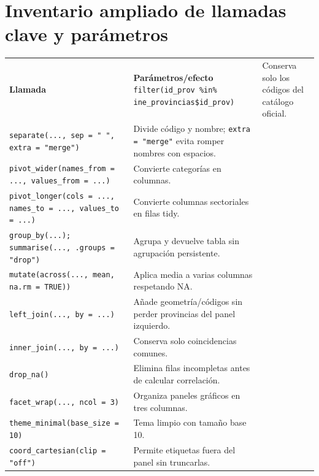 \documentclass[10pt,a4paper]{article}
\newcommand{\code}[1]{\texttt{\small #1}}
\begin{document}
\section{Inventario ampliado de llamadas clave y parámetros}
\begin{longtable}{p{}p{}}
\toprule\textbf{Llamada} & \textbf{Parámetros/efecto}\
\midrule\endhead
\code{filter(id\_prov \%in\% ine\_provincias\$id\_prov)} & Conserva solo los códigos del catálogo oficial.\\
\code{separate(..., sep = " ", extra = "merge")} & Divide código y nombre; \code{extra = "merge"} evita romper nombres con espacios.\\
\code{pivot\_wider(names\_from = ..., values\_from = ...)} & Convierte categorías en columnas.\\
\code{pivot\_longer(cols = ..., names\_to = ..., values\_to = ...)} & Convierte columnas sectoriales en filas tidy.\\
\code{group\_by(...); summarise(..., .groups = "drop")} & Agrupa y devuelve tabla sin agrupación persistente.\\
\code{mutate(across(..., mean, na.rm = TRUE))} & Aplica media a varias columnas respetando NA.\\
\code{left\_join(..., by = ...)} & Añade geometría/códigos sin perder provincias del panel izquierdo.\\
\code{inner\_join(..., by = ...)} & Conserva solo coincidencias comunes.\\
\code{drop\_na()} & Elimina filas incompletas antes de calcular correlación.\\
\code{facet\_wrap(..., ncol = 3)} & Organiza paneles gráficos en tres columnas.\\
\code{theme\_minimal(base\_size = 10)} & Tema limpio con tamaño base 10.\\
\code{coord\_cartesian(clip = "off")} & Permite etiquetas fuera del panel sin truncarlas.\\
\bottomrule\end{longtable}
\end{document}

